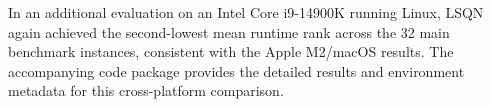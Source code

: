 In an additional evaluation on an Intel Core i9-14900K running Linux,
LSQN again achieved the second-lowest mean runtime rank across the
32 main benchmark instances, consistent with the Apple M2/macOS results.
The accompanying code package provides the detailed results and
environment metadata for this cross-platform comparison.
